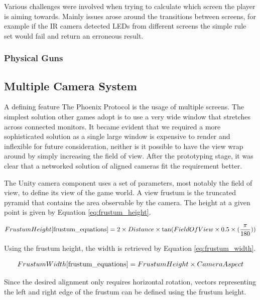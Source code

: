 \documentclass[a4paper,11pt]{article}
\begin{document}
Various challenges were involved when trying to calculate which screen the player is aiming towards. Mainly issues arose around the transitions between screens, for example if the IR camera detected LEDs from different screens the simple rule set would fail and return an erroneous result. 

\subsubsection{Physical Guns}

\subsection{Multiple Camera System}
A defining feature The Phoenix Protocol is the usage of multiple screens. The simplest solution other games adopt is to use a very wide window that stretches across connected monitors. It became evident that we required a more sophisticated solution as a single large window is expensive to render and inflexible for future consideration, neither is it possible to have the view wrap around by simply increasing the field of view. After the prototyping stage, it was clear that a networked solution of aligned cameras fit the requirement better.

The Unity camera component\cite{unity_camera} uses a set of parameters, most notably the field of view, to define its view of the game world. A view frustum \cite{unity_frustum} is the truncated pyramid that contains the area observable by the camera. The height at a given point is given by Equation \ref{eq:frustum_height}.


\begin{align}
	Frustum Height\cite{frustum_equations} = 2 \times Distance \times \tan(Field Of View \times 0.5 \times (\frac{\pi}{180}))
    \label{eq:frustum_height}
\end{align}

Using the frustum height, the width is retrieved by Equation \ref{eq:frustum_width}.

\begin{align}
	Frustum Width\cite{frustum_equations} = Frustum Height \times Camera Aspect
    \label{eq:frustum_width}
\end{align}

Since the desired alignment only requires horizontal rotation, vectors representing the left and right edge of the frustum can be defined using the frustum height.
\end{document}
